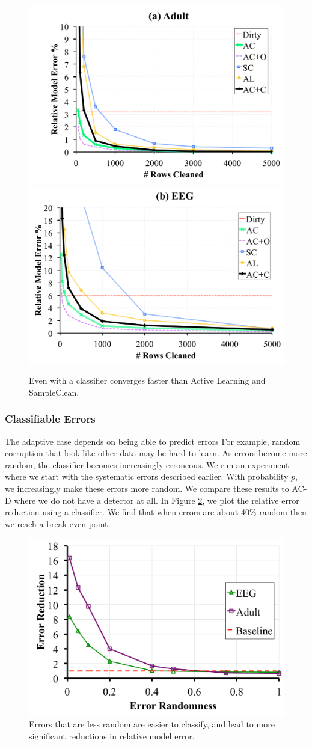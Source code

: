 \begin{figure}[t]
\centering
 \includegraphics[width=0.49\columnwidth]{exp/exp11a.pdf}
 \includegraphics[width=0.49\columnwidth]{exp/exp11b.pdf}
 \caption{Even with a classifier \sys converges faster than Active Learning and SampleClean. \label{pred-perf}}
\end{figure}

\subsubsection{Classifiable Errors}
The adaptive case depends on being able to predict errors
For example, random corruption that look like other data may be hard to learn.
As errors become more random, the classifier becomes increasingly erroneous.
We run an experiment where we start with the systematic errors described earlier.
With probability $p$, we increasingly make these errors more random.
We compare these results to AC-D where we do not have a detector at all.
In Figure \ref{tradeoffs2}, we plot the relative error reduction using a classifier.
We find that when errors are about 40\% random then we reach a break even point.

\begin{figure}[ht!]
\vspace{-1em}
\centering
 \includegraphics[width=0.5\columnwidth]{exp/exp5a.pdf}
 \caption{Errors that are less random are easier to classify, and lead to more significant reductions in relative model error. \label{tradeoffs2}}
\end{figure}

